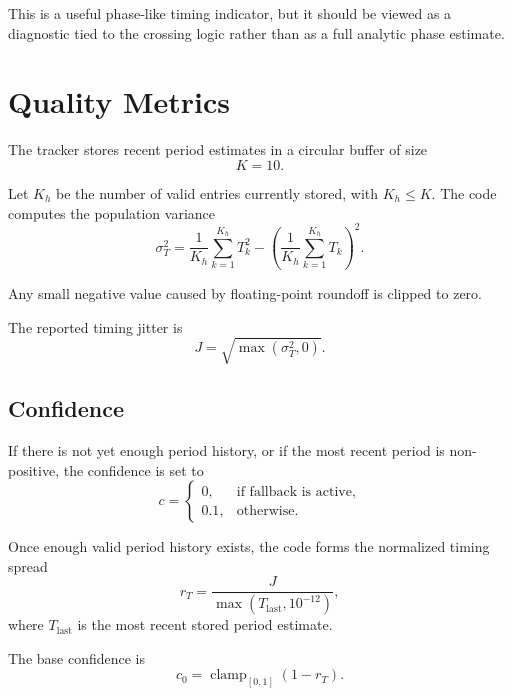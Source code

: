 \documentclass[conference]{IEEEtran}
\begin{document}
This is a useful phase-like timing indicator, but it should be viewed as a
diagnostic tied to the crossing logic rather than as a full analytic phase
estimate.

\section{Quality Metrics}

The tracker stores recent period estimates in a circular buffer of size
\begin{equation}
  K = 10.
\end{equation}

Let \(K_h\) be the number of valid entries currently stored, with
\(K_h \le K\). The code computes the population variance
\begin{equation}
  \sigma_T^2
  =
  \frac{1}{K_h}\sum_{k=1}^{K_h} T_k^2
  -
  \left(
    \frac{1}{K_h}\sum_{k=1}^{K_h} T_k
  \right)^2.
\end{equation}

Any small negative value caused by floating-point roundoff is clipped to zero.

The reported timing jitter is
\begin{equation}
  J = \sqrt{\max(\sigma_T^2,0)}.
\end{equation}

\subsection{Confidence}

If there is not yet enough period history, or if the most recent period is
non-positive, the confidence is set to
\begin{equation}
  c =
  \begin{cases}
    0, & \text{if fallback is active},\\
    0.1, & \text{otherwise}.
  \end{cases}
\end{equation}

Once enough valid period history exists, the code forms the normalized timing
spread
\begin{equation}
  r_T = \frac{J}{\max(T_{\mathrm{last}},10^{-12})},
\end{equation}
where \(T_{\mathrm{last}}\) is the most recent stored period estimate.

The base confidence is
\begin{equation}
  c_0 = \operatorname{clamp}_{[0,1]}(1-r_T).
\end{equation}
\end{document}
